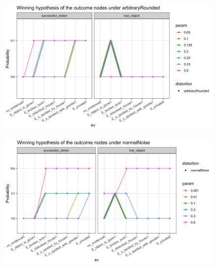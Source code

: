 \documentclass[11pt]{amsart}
\begin{document}
\begin{figure}[htbp]
\begin{center}
\includegraphics[scale=0.17]{images/arbitraryRoundedWeak.png}
\label{default}
\end{center}
\end{figure}
\begin{figure}[htbp]
\begin{center}
\includegraphics[scale=0.17]{images/normalNoiseWeak.png}
\label{default}
\end{center}
\end{figure}
\end{document}
